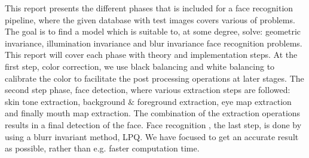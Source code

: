 This report presents the different phases that is included for a face recognition pipeline, where the 
given database with test images covers various of problems. The 
goal is to find a model which is suitable to, at some degree, solve: 
geometric invariance, illumination invariance and blur invariance face 
recognition problems. This report will cover each phase with
theory and implementation steps. At the first step, color correction, we 
use black balancing and white balancing to calibrate the color to 
facilitate the post processing operations at later stages.
The second step phase, face detection, where various extraction steps 
are followed: skin tone extraction, background $\&$ foreground extraction, eye 
map extraction and finally mouth map extraction. The combination of the 
extraction operations results in a final detection of the face. Face recognition
, the last step, is done by using a blurr invariant method, LPQ. We have focused
to get an accurate result as possible, rather than e.g. faster computation time.
\newline
\newline
